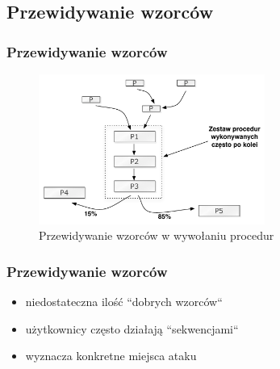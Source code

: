 \documentclass{beamer}
\begin{document}
\subsection{Przewidywanie wzorców}
\begin{frame}
  \frametitle{Przewidywanie wzorców}
    \begin{figure}
      \includegraphics[width=20em]{procedure_execution.pdf}
      \caption{Przewidywanie wzorców w wywołaniu procedur}
    \end{figure}
\end{frame}
\begin{frame}
  \frametitle{Przewidywanie wzorców}
  \begin{itemize}
    \item niedostateczna ilość ``dobrych wzorców``
    \item użytkownicy często działają ``sekwencjami``
    \item wyznacza konkretne miejsca ataku
  \end{itemize}
\end{frame}
\end{document}
